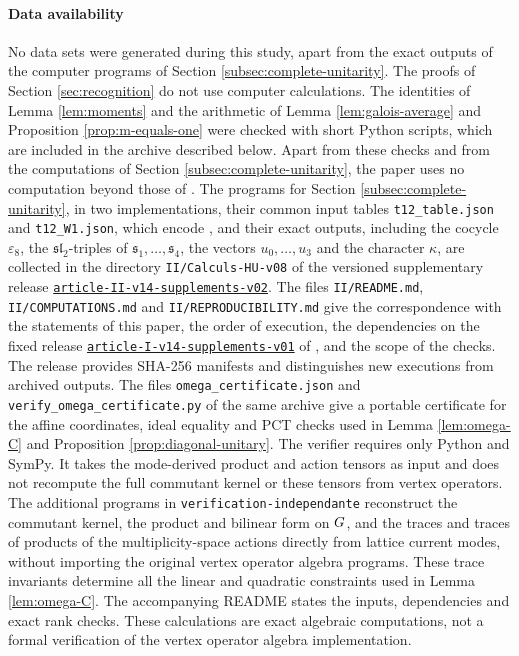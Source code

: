 \documentclass[leqno]{article}
\let\cal\relax
\newcommand{\cal}{\mathcal}
\newcommand{\epsi}{\varepsilon}
\numberwithin{equation}{section}
\begin{document}
\paragraph{Data availability} No data sets were generated during this study, apart from the exact outputs of the computer programs of Section \ref{subsec:complete-unitarity}. The proofs of Section \ref{sec:recognition} do not use computer calculations. The identities of Lemma \ref{lem:moments} and the arithmetic of Lemma \ref{lem:galois-average} and Proposition \ref{prop:m-equals-one} were checked with short Python scripts, which are included in the archive described below. Apart from these checks and from the computations of Section \ref{subsec:complete-unitarity}, the paper uses no computation beyond those of \cite{Arh26}. The programs for Section \ref{subsec:complete-unitarity}, in two implementations, their common input tables \texttt{t12\_table.json} and \texttt{t12\_W1.json}, which encode \cite[Table 2]{Arh26}, and their exact outputs, including the cocycle $\epsi_8$, the $\mathfrak{sl}_2$-triples of $\mathfrak s_1, \ldots, \mathfrak s_4$, the vectors $u_0, \ldots, u_3$ and the character $\kappa$, are collected in the directory \texttt{II/Calculs-HU-v08} of the versioned supplementary release \href{https://github.com/cedricarhancet/haagerup-c8/releases/tag/article-II-v14-supplements-v02}{\texttt{article-II-v14-supplements-v02}}. The files \texttt{II/README.md}, \texttt{II/COMPUTATIONS.md} and \texttt{II/REPRODUCIBILITY.md} give the correspondence with the statements of this paper, the order of execution, the dependencies on the fixed release \href{https://github.com/cedricarhancet/haagerup-c8/releases/tag/article-I-v14-supplements-v01}{\texttt{article-I-v14-supplements-v01}} of \cite{Arh26}, and the scope of the checks. The release provides SHA-256 manifests and distinguishes new executions from archived outputs. The files \texttt{omega\_certificate.json} and \texttt{verify\_omega\_certificate.py} of the same archive give a portable certificate for the affine coordinates, ideal equality and PCT checks used in Lemma \ref{lem:omega-C} and Proposition \ref{prop:diagonal-unitary}. The verifier requires only Python and SymPy. It takes the mode-derived product and action tensors as input and does not recompute the full commutant kernel or these tensors from vertex operators. The additional programs in \texttt{verification-independante} reconstruct the commutant kernel, the product and bilinear form on $\cal G$, and the traces and traces of products of the multiplicity-space actions directly from lattice current modes, without importing the original vertex operator algebra programs. These trace invariants determine all the linear and quadratic constraints used in Lemma \ref{lem:omega-C}. The accompanying README states the inputs, dependencies and exact rank checks. These calculations are exact algebraic computations, not a formal verification of the vertex operator algebra implementation.
\end{document}
